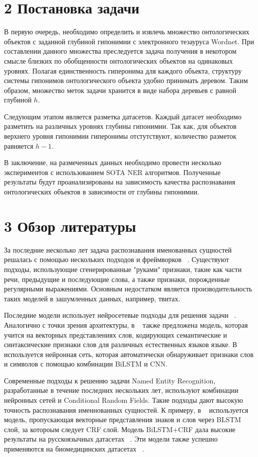 \documentclass[12pt,twoside]{article}
\begin{document}
\section{2 Постановка задачи} 
{
    В первую очередь, необходимо определить и извлечь множество онтологических объектов с заданной глубиной гипонимии с электронного тезауруса Wordnet. При составлении данного множества преследуется задача получения в некотором смысле близких по обобщенности онтологических объектов на одинаковых уровнях. Полагая единственность гиперонима для каждого объекта, структуру системы гипонимов онтологического объекта удобно принимать деревом. Таким образом, множество меток задачи хранится в виде набора деревьев с равной глубиной $h$. 
    
    Следующим этапом является разметка датасетов. Каждый датасет необходимо разметить на различных уровнях глубины гипонимии. Так как, для объектов верхнего уровня гипонимии гиперонимы отстутствуют, количество разметок равняется $h-1$.
    
    В заключение, на размеченных данных необходимо провести несколько экспериментов с использованием SOTA NER алгоритмов. Полученные результаты будут проанализированы на зависимость качества распознавания онтологических объектов в зависимости от глубины гипонимии.  }
\bigskip
    
\section{3 Обзор литературы}
{
    За последние несколько лет задача распознавания именованных сущностей решалась с помощью нескольких подходов и фреймворков ~\cite{Nadeau2007ASO, Roberts2008CombiningTR}. Существуют подходы, использующие сгенерированные "руками" признаки, такие как части речи, предыдущие и последующие слова, а также признаки, порожденные регулярными выражениями. Основным недостатком является производительность таких моделей в зашумленных данных, например, твитах. 
    
    Последние модели использует нейросетевые подходы для решения задачи ~\cite{Lample2016NeuralAF}.  Аналогично с точки зрения архитектуры, в ~\cite{AlRfou2015POLYGLOTNERMM} также предложена модель, которая учится на векторных представлениях слов, кодирующих семантические и синтаксические признаки слов для различных естественных языков языке. В ~\cite{Chiu2016NamedER} используется нейронная сеть, которая автоматически обнаруживает признаки слов и символов с помощью комбинации BiLSTM и CNN. 
    
    Современные подходы к решению задачи Named Entity Recognition, разработанные в течение последних нескольких лет, используют комбинации нейронных сетей и Conditional Random Fields. Такие подходы дают высокую точность распознавания именнованных сущностей. К примеру, в ~\cite{Ma2016EndtoendSL} используется модель, пропускающая векторные представления знаков и слов через BLSTM слой, за котороым следует CRF слой. Модель BiLSTM$+$CRF дала высокие результаты на русскоязычных датасетах ~\cite{Anh2017ApplicationOA}. Эти модели также успешно применяются на биомедицинских датасетах  ~\cite{Lyu2017LongSM, Gridach2017CharacterlevelNN}. 
    
}


\bigskip
\bigskip
\bigskip


\end{document}
